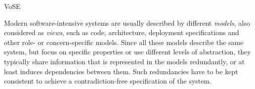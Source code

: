 \begin{copiedFrom}{VoSE}

Modern %
software-intensive systems are usually described by different \emph{models}, also considered as \emph{views}, such as code, architecture, deployment specifications and other role- or concern-specific models.
Since all these models describe the same system, but focus on specific properties or use different levels of abstraction, they typically share information that is represented in the models redundantly, or at least induces dependencies between them.
Such redundancies have to be kept consistent to achieve a contradiction-free specification of the %
system.




\end{copiedFrom}
